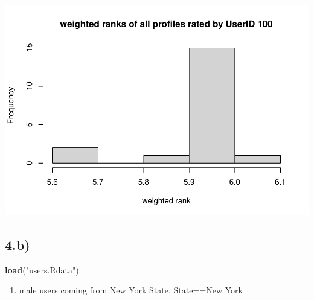 \documentclass[
]{article}
\newenvironment{Shaded}{\begin{snugshade}}{\end{snugshade}}
\newcommand{\KeywordTok}[1]{\textcolor[rgb]{0.13,0.29,0.53}{\textbf{#1}}}
\newcommand{\NormalTok}[1]{#1}
\newcommand{\StringTok}[1]{\textcolor[rgb]{0.31,0.60,0.02}{#1}}
\providecommand{\tightlist}{%
  \setlength{\itemsep}{0pt}\setlength{\parskip}{0pt}}
\begin{document}
\includegraphics{stad80a1_files/figure-latex/unnamed-chunk-19-1.pdf}

\hypertarget{b-1}{%
\subsection{4.b)}\label{b-1}}

\begin{Shaded}
\begin{Highlighting}[]
\KeywordTok{load}\NormalTok{(}\StringTok{"users.Rdata"}\NormalTok{)}
\end{Highlighting}
\end{Shaded}

\begin{enumerate}
\def\labelenumi{\arabic{enumi})}
\tightlist
\item
  male users coming from New York State, State==New York
\end{enumerate}
\end{document}
